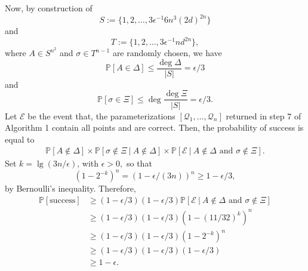 \documentclass[sigconf]{acmart}
\def\pr{\mathbb{P}}
\begin{document}
Now, by construction of \[S := \{1,2,\hdots,3\epsilon^{-1}6n^3(2d)^{2n}\}\] and \[T := \{1,2,\hdots,3\epsilon^{-1}nd^{2n}\},\] where $A \in S^{n^2}$ and  $\sigma \in T^{n-1}$ are randomly chosen, we have 
%
\[
\pr[A \in \Delta] \leq  \frac{\deg\Delta}{|S|} = \epsilon/3
\]
and
\[
\pr[\sigma \in \Xi] \leq \deg \frac{\deg\Xi}{|S|} = \epsilon/3.
\]
%
Let $\mathscr{E}$ be the event that, the parameterizations $[\mathscr{Q}_1,\hdots,\mathscr{Q}_n]$ returned in step 7 of Algorithm 1 contain all points and are correct. Then, the probability of success is equal to
\begin{align*}
 \pr[A \not\in \Delta] \times \pr[\sigma \not \in \Xi ~|~A \not\in \Delta] \times \pr[\mathscr{E}~|~A \not\in \Delta \textrm{ and } \sigma \not \in \Xi].
\end{align*}
%
Set $k = \lg(3n/\epsilon)$, with $\epsilon>0,$ so that 
\[
(1-2^{-k})^n = (1 - \epsilon/(3n))^n \geq 1 - \epsilon/3,
\]
by Bernoulli's inequality. Therefore, 
\begin{align*}
\pr[\textrm{success}] &\geq  (1- \epsilon/3)(1- \epsilon/3)\pr[\mathscr{E}~|~A \not\in \Delta \textrm{ and } \sigma \not \in \Xi]\\
&\geq (1- \epsilon/3)(1- \epsilon/3)(1-(11/32)^k)^n\\
& \geq (1- \epsilon/3)(1- \epsilon/3)(1-2^{-k})^n \\
& \geq (1- \epsilon/3)(1- \epsilon/3)(1- \epsilon/3)\\
& \geq 1 - \epsilon.
\end{align*}


\end{document}
